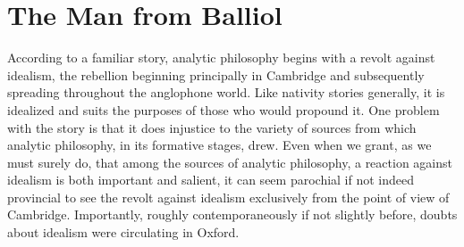 \documentclass[12pt]{article}
\title{\mytitle} %
\author{\myauthor}
\date{} %
\begin{document}
\maketitle

\setlength{\parindent}{1em}

\section{The Man from Balliol} %
\label{sec:the_balliol_man_in_a_ragged_scholar_s_gown}

According to a familiar story, analytic philosophy begins with a revolt against idealism, the rebellion beginning principally in Cambridge and subsequently spreading throughout the anglophone world. Like nativity stories generally, it is idealized and suits the purposes of those who would propound it. One problem with the story is that it does injustice to the variety of sources from which analytic philosophy, in its formative stages, drew. Even when we grant, as we must surely do, that among the sources of analytic philosophy, a reaction against idealism is both important and salient, it can seem parochial if not indeed provincial to see the revolt against idealism exclusively from the point of view of Cambridge. Importantly, roughly contemporaneously if not slightly before, doubts about idealism were circulating in Oxford. 
\end{document}
